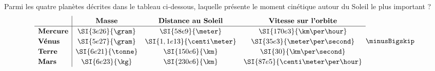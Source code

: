 
\finEntrainement







\hauteurLargeurCadreReponse		{7mm}{2cm}
\initialisationEntrainement


\debutEntrainement


\begin{enonce}
Parmi les quatre planètes décrites dans le tableau ci-dessous, laquelle présente le moment cinétique autour du Soleil le plus important ?
\[
	\renewcommand{\arraystretch}{1.2}
	\begin{array}{l|ccc}
			&	\textbf{Masse}	&	\mbox{\quad}\textbf{Distance au Soleil}\mbox{\quad}	&	\textbf{Vitesse sur l'orbite}
			\\ \hline
		\textbf{Mercure}
			&	\SI{3e26}{\gram}
			&	\SI{58e9}{\meter}
			&	\SI{170e3}{\km\per\hour}	\\
		\textbf{Vénus}
			&	\SI{5e27}{\gram}
			&	\SI{1,1e13}{\centi\meter}
			&	\SI{35e3}{\meter\per\second}	\\
		\textbf{Terre}
			&	\SI{6e21}{\tonne}
			&	\SI{150e6}{\km}
			&	\SI{30}{\km\per\second}	\\
		\textbf{Mars}
			&	\SI{6e23}{\kg}
			&	\SI{230e6}{\km}
			&	\SI{87e5}{\centi\meter\per\hour}
	\end{array}
	\renewcommand{\arraystretch}{1}
	\minusBigskip
\]
\end{enonce}

